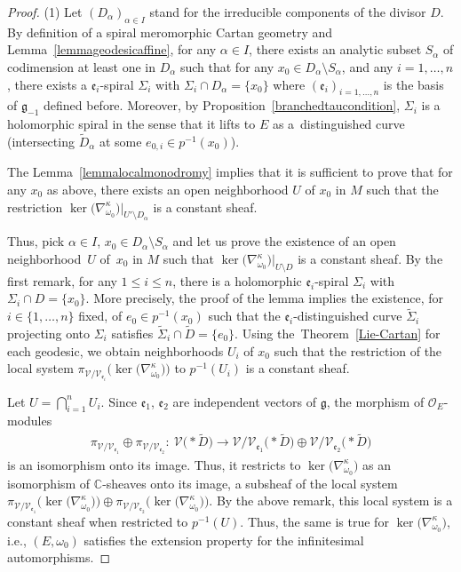 \documentclass[pdftex]{sigma}
\numberwithin{equation}{section}
\begin{document}
\begin{proof} (1) Let $(D_\alpha)_{\alpha\in I}$ stand for the irreducible components of the divisor $D$. By definition of a spiral meromorphic Cartan geometry and Lemma~\ref{lemmageodesicaffine}, for any $\alpha\in I$, there exists an analytic subset $S_\alpha$ of codimension at least one in $D_\alpha$ such that for any $x_0\in D_\alpha\setminus S_\alpha$, and any $i=1,\dots,n$, there exists a $\mathfrak{e}_i$-spiral $\Sigma_i$ with $\Sigma_i\cap D_\alpha=\{x_0\}$ where $(\mathfrak{e}_i)_{i=1,\dots,n}$ is the basis of $\mathfrak{g}_{-1}$ defined before. Moreover, by Proposition~\ref{branchedtaucondition}, $\Sigma_i$ is a holomorphic spiral in the sense that it lifts to $E$ as a~distinguished curve (intersecting $\tilde{D}_\alpha$ at some $e_{0,i}\in p^{-1}(x_0)$).

The Lemma~\ref{lemmalocalmonodromy} implies that it is sufficient to prove that for any $x_0$ as above, there exists an open neighborhood $U$ of $x_0$ in $M$ such that the restriction $\ker\big(\nabla^\kappa_{\omega_0}\big)|_{U'\setminus D_\alpha}$ is a constant sheaf.

Thus, pick $\alpha \in I$, $x_0 \in D_\alpha\setminus S_\alpha$ and let us prove the existence of an open neighborhood~$U$ of~$x_0$ in $M$ such that $\ker\big(\nabla^\kappa_{\omega_0}\big)|_{U\setminus D}$ is a constant sheaf. By the first remark, for any $1\leq i\leq n$, there is a holomorphic $\mathfrak{e}_i$-spiral $\Sigma_i$ with $\Sigma_i \cap D=\{x_0\}$. More precisely, the proof of the lemma implies the existence, for $i\in \{1,\dots,n\}$ fixed, of $e_0\in p^{-1}(x_0)$ such that the $\mathfrak{e}_i$-distinguished curve $\tilde{\Sigma}_i$ projecting onto $\Sigma_i$ satisfies $\tilde{\Sigma}_i \cap \tilde{D}=\{e_0\}$. Using the~Theorem~\ref{Lie-Cartan} for each geodesic, we obtain neighborhoods $U_i$ of $x_0$ such that the restriction of the local system $\pi_{\mathcal{V}/\mathcal{V}_{\mathfrak{e}_i}}\bigl(\ker\bigl(\nabla^\kappa_{\omega_0}\bigr)\bigr)$ to $p^{-1}(U_i)$ is a constant sheaf.

Let $U=\bigcap_{i=1}^{n} U_i$. Since $\mathfrak{e}_1$, $\mathfrak{e}_2$ are independent vectors of $\mathfrak{g}$, the morphism of $\mathcal{O}_E$-modules
\begin{align}\label{piV1V2}
 \pi_{\mathcal{V}/\mathcal{V}_{\mathfrak{e}_1}} \oplus \pi_{\mathcal{V}/\mathcal{V}_{\mathfrak{e}_2}}\colon \ \mathcal{V}\bigl(* \tilde{D}\bigr) \longrightarrow \mathcal{V}/\mathcal{V}_{\mathfrak{e}_1}\bigl(* \tilde{D}\bigr) \oplus \mathcal{V}/\mathcal{V}_{\mathfrak{e}_2}\bigl(* \tilde{D}\bigr) \end{align}
 is an isomorphism onto its image. Thus, it restricts to $\ker\big(\nabla^\kappa_{\omega_0}\big)$ as an isomorphism of $\mathbb{C}$-sheaves onto its image, a subsheaf of the local system $\pi_{\mathcal{V}/\mathcal{V}_{\mathfrak{e}_1}}\!\big( \ker\big(\nabla^\kappa_{\omega_0}\big)\big) \oplus \pi_{\mathcal{V}/\mathcal{V}_{\mathfrak{e}_2}}\!\big(\ker\big(\nabla^\kappa_{\omega_0}\big)\big)$. By the above remark, this local system is a constant sheaf when restricted to $p^{-1}(U)$. Thus, the same is true for $\ker\big(\nabla^\kappa_{\omega_0}\big)$, i.e., $(E,\omega_0)$ satisfies the extension property for the infinitesimal automorphisms.


\end{proof}
\end{document}
